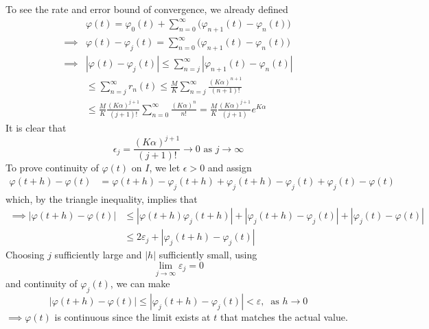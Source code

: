 \documentclass{article}
\begin{document}
    To see the rate and error bound of convergence, we already defined
    \begin{align*}
        & \varphi(t) = \varphi_0 (t) + \sum_{n=0}^\infty \big(\varphi_{n+1} (t) - \varphi_n (t)\big) \\
        \implies & \varphi (t) - \varphi_j (t) = \sum_{n=0}^\infty \big(\varphi_{n+1} (t) - \varphi_n (t)\big) \\
        \implies & |\varphi(t) - \varphi_j (t)| \leq \sum_{n=j}^\infty |\varphi_{n+1} (t) - \varphi_n (t)| \\
        & \leq \sum_{n=j}^\infty r_n (t) \leq \frac{M}{K} \sum_{n=j}^\infty \frac{(K \alpha)^{n+1}}{(n+1)!} \\
        & \leq \frac{M}{K} \frac{(K \alpha)^{j+1}}{(j+1)!} \sum_{n=0}^\infty \frac{(K\alpha)^n}{n!} = \frac{M}{K} \frac{(K\alpha)^{j+1}}{(j+1)} e^{K \alpha}
    \end{align*}
    It is clear that 
    \begin{equation}
      \epsilon_j = \frac{(K \alpha)^{j+1}}{(j+1)!} \rightarrow 0 \text{ as } j \rightarrow \infty
    \end{equation}
    To prove continuity of $\varphi(t)$ on $I$, we let $\epsilon > 0$ and assign 
    \begin{align*}
        \varphi(t+h) - \varphi(t) & = \varphi(t+h) - \varphi_j (t+h) + \varphi_j (t+h) - \varphi_j (t) + \varphi_j (t) - \varphi(t) 
    \end{align*}
    which, by the triangle inequality, implies that
    \begin{align*}
        \implies |\varphi(t+h) - \varphi(t)| & \leq |\varphi(t+h) \varphi_j  (t+h)| + |\varphi_j (t+h) - \varphi_j (t)| + |\varphi_j (t) - \varphi(t)| \\
        & \leq 2 \varepsilon_j + |\varphi_j (t+h) - \varphi_j (t)| 
    \end{align*}
    Choosing $j$ sufficiently large and $|h|$ sufficiently small, using 
    \begin{equation}
      \lim_{j \rightarrow \infty} \varepsilon_j = 0
    \end{equation}
    and continuity of $\varphi_j (t)$, we can make
    \begin{equation}
      |\varphi(t+h) - \varphi(t)| \leq |\varphi_j (t+h) - \varphi_j (t)| < \varepsilon, \;\; \text{as } h \rightarrow 0
    \end{equation}
    $\implies \varphi(t)$ is continuous since the limit exists at $t$ that matches the actual value. 
\end{document}
